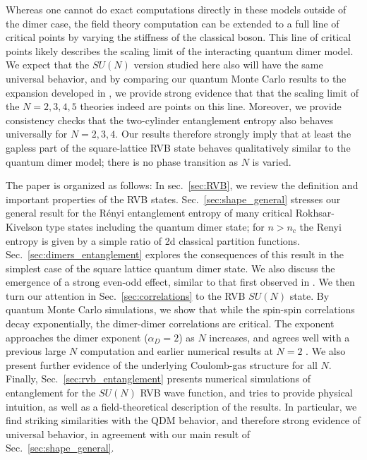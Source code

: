\documentclass[11pt]{iopart}
\begin{document}
Whereas one cannot do exact computations directly in these models outside of the dimer case, the field theory computation can be extended to a full line of critical points by varying the stiffness of the classical boson. This line of critical points likely describes the scaling limit of the interacting quantum dimer model\cite{Alet_dimers1,Alet_dimers2,Damle}.  We expect that the $SU(N)$ version studied here also will have the same universal behavior, and by comparing our quantum Monte Carlo results to the expansion developed in \cite{Damle}, we provide strong evidence that that the scaling limit of the $N=2,3,4,5$ theories indeed are points on this line. Moreover, we provide consistency checks that the two-cylinder entanglement entropy also behaves universally for $N=2,3,4$. Our results therefore strongly imply that at least the gapless part of the square-lattice RVB state behaves qualitatively similar to the quantum dimer model; there is no phase transition as $N$ is varied.


The paper is organized as follows:
In sec.\ \ref{sec:RVB}, we review the definition and important properties of the RVB states. Sec.~\ref{sec:shape_general} stresses our general result for the R\'enyi entanglement entropy of many critical Rokhsar-Kivelson type states including the quantum dimer state;  for $n>n_c$ the Renyi entropy is given by a simple ratio of 2d classical partition functions.   Sec.~\ref{sec:dimers_entanglement} explores the consequences of this result in the simplest case of the square lattice quantum dimer state. We also discuss the emergence of a strong even-odd effect, similar to that first observed in \cite{Ju2012}. We then turn our attention in Sec.~\ref{sec:correlations} to the RVB $SU(N)$ state.  By quantum Monte Carlo simulations, we show that while the spin-spin correlations decay exponentially, the dimer-dimer correlations are critical. The exponent approaches the dimer exponent ($\alpha_D=2$) as $N$ increases, and agrees well with a previous large $N$ computation \cite{Damle} and earlier numerical results at 
$N=2$ \cite{RVB1,RVB2}. We also present further evidence of the underlying Coulomb-gas structure for all $N$.
Finally, Sec.~\ref{sec:rvb_entanglement} presents numerical simulations of entanglement for the $SU(N)$ RVB wave function, and tries to provide physical intuition, as well as a field-theoretical description of the results. In particular, we find striking similarities with the QDM behavior, and therefore strong evidence of universal behavior, in agreement with our main result of Sec.~\ref{sec:shape_general}. 
\end{document}
